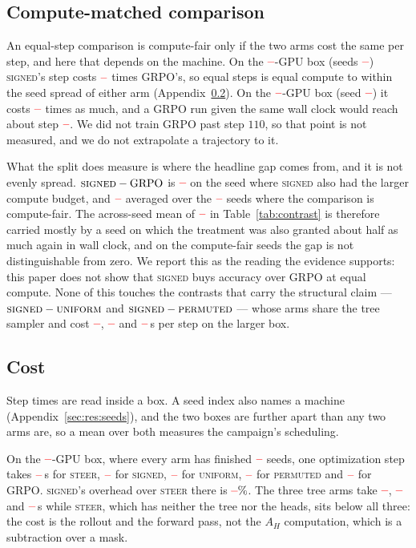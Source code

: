 \documentclass[11pt]{article}
\newcommand{\AH}{A_{H}}
\providecommand{\PENDING}{\textcolor{red}{\textbf{--}}}
\newcommand{\num}[1]{\ifcsname #1\endcsname\csname #1\endcsname\else\PENDING\fi}
\begin{document}
\subsection{Compute-matched comparison}
\label{sec:res:compute}

An equal-step comparison is compute-fair only if the two arms cost the same per
step, and here that depends on the machine. On the $\num{Costgpushi}$-GPU box
(seeds $\num{Cmhiseeds}$) \textsc{signed}'s step costs $\num{Cmhiratio}$ times GRPO's,
so equal steps is equal compute to within the seed spread of either arm
(Appendix~\ref{sec:res:cost}). On the $\num{Costgpuslo}$-GPU box (seed
$\num{Cmloseeds}$) it costs $\num{Cmloratio}$ times as much, and a GRPO run given
the same wall clock would reach about step $\num{Cmlostep}$. We did not train GRPO
past step $110$, so that point is not measured, and we do not extrapolate a
trajectory to it.

What the split does measure is where the headline gap comes from, and it is not
evenly spread. $\textsc{signed} - \text{GRPO}$ is $\num{Cmlosignedgrpoacc}$ on the
seed where \textsc{signed} also had the larger compute budget, and $\num{Cmhisignedgrpoacc}$
averaged over the $\num{Cmhin}$ seeds where the comparison is compute-fair. The
across-seed mean of $\num{Csignedgrpoacc}$ in Table~\ref{tab:contrast} is
therefore carried mostly by a seed on which the treatment was also granted about
half as much again in wall clock, and on the compute-fair seeds the gap is not
distinguishable from zero. We report this as the reading the evidence supports:
this paper does not show that \textsc{signed} buys accuracy over GRPO at equal compute.
None of this touches the contrasts that carry the structural claim ---
$\textsc{signed} - \textsc{uniform}$ and $\textsc{signed} - \textsc{permuted}$ ---
whose arms share the tree sampler and cost $\num{Costsignedhi}$,
$\num{Costuniformhi}$ and $\num{Costpermutedhi}$\,s per step on the larger box.

\subsection{Cost}
\label{sec:res:cost}

Step times are read inside a box. A seed index also names a machine
(Appendix~\ref{sec:res:seeds}), and the two boxes are further apart than any two arms
are, so a mean over both measures the campaign's scheduling.

On the $\num{Costgpushi}$-GPU box, where every arm has finished
$\num{Costnsignedhi}$ seeds, one optimization step takes $\num{Coststeerhi}$\,s for
\textsc{steer}, $\num{Costsignedhi}$ for \textsc{signed}, $\num{Costuniformhi}$ for
\textsc{uniform}, $\num{Costpermutedhi}$ for \textsc{permuted} and
$\num{Costgrpohi}$ for GRPO. \textsc{signed}'s overhead over \textsc{steer} there is
$\num{Costoverheadhi}\%$. The three tree arms take $\num{Costsignedhi}$, $\num{Costuniformhi}$ and
$\num{Costpermutedhi}$\,s while \textsc{steer}, which has neither the tree nor the
heads, sits below all three: the cost is the rollout and the forward
pass, not the $\AH$ computation, which is a subtraction over a mask.
\end{document}
